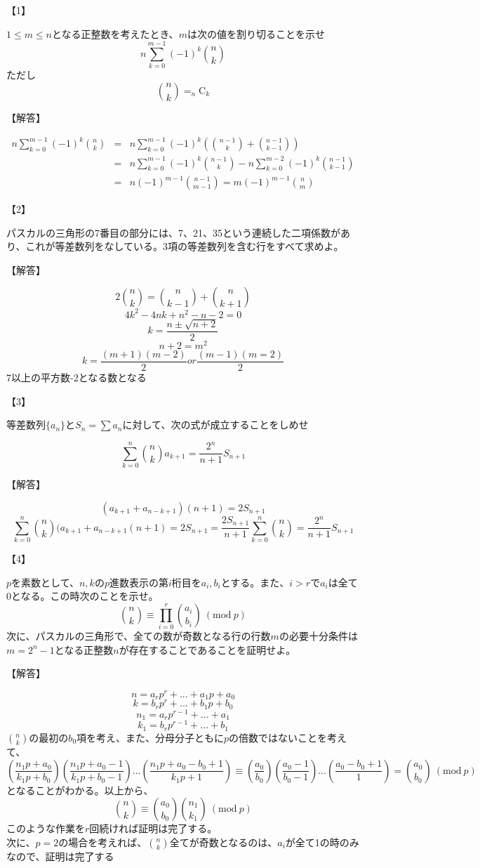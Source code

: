 \documentclass[a4paper,fleqn,dvipdfmx]{jsarticle}
\begin{document}
\begin{flushleft}
【1】
\end{flushleft}
$1\leq m\leq n$となる正整数を考えたとき、$m$は次の値を割り切ることを示せ
$$n\sum_{k=0}^{m-1}(-1)^k\binom{n}{k}
$$
ただし
$$\binom{n}{k}=_n\mathrm{C}_k$$
\begin{flushleft}
【解答】
\end{flushleft}
\begin{eqnarray}
n\sum_{k=0}^{m-1}(-1)^k\binom{n}{k}&=&n\sum_{k=0}^{m-1}(-1)^k\left(\binom{n-1}{k}+\binom{n-1}{k-1}\right)\\
&=&n\sum_{k=0}^{m-1}(-1)^k\binom{n-1}{k}-n\sum_{k=0}^{m-2}(-1)^k\binom{n-1}{k-1}\\
&=&n(-1)^{m-1}\binom{n-1}{m-1}=m(-1)^{m-1}\binom{n}{m}
\end{eqnarray}

\begin{flushleft}
【2】
\end{flushleft}
パスカルの三角形の7番目の部分には、7、21、35という連続した二項係数があり、これが等差数列をなしている。3項の等差数列を含む行をすべて求めよ。
\begin{flushleft}
【解答】
\end{flushleft}
$$2\binom{n}{k}=\binom{n}{k-1}+\binom{n}{k+1}$$
$$4k^2-4nk+n^2-n-2=0$$
$$k=\frac{n\pm \sqrt{n+2}}{2}$$
$$n+2=m^2$$
$$k=\frac{(m+1)(m-2)}{2} or \frac{(m-1)(m=2)}{2}$$
7以上の平方数-2となる数となる

\begin{flushleft}
【3】
\end{flushleft}
等差数列$\{a_n\}$と$S_n=\sum a_n$に対して、次の式が成立することをしめせ

$$\sum_{k=0}^{n}\binom{n}{k}a_{k+1}=\frac{2^n}{n+1}S_{n+1}$$
\begin{flushleft}
【解答】
\end{flushleft}
$$(a_{k+1}+a_{n-k+1})(n+1)=2S_{n+1}$$
$$\sum_{k=0}^n\binom{n}{k}(a_{k+1}+a_{n-k+1}(n+1)=2S_{n+1}=\frac{2S_{n+1}}{n+1}\sum_{k=0}^{n}\binom{n}{k}=\frac{2^n}{n+1}S_{n+1}$$

\begin{flushleft}
【4】
\end{flushleft}
$p$を素数として、$n,k$の$p$進数表示の第$i$桁目を$a_i,b_i$とする。また、$i>r$で$a_i$は全て$0$となる。この時次のことを示せ。
$$\binom{n}{k}\equiv\prod_{i=0}^{r}\binom{a_i}{b_i}\ (\mathrm{mod}\ p)$$
次に、パスカルの三角形で、全ての数が奇数となる行の行数$m$の必要十分条件は$m=2^n-1$となる正整数$n$が存在することであることを証明せよ。
\begin{flushleft}
【解答】
\end{flushleft}
$$n=a_rp^r+...+a_1p+a_0$$
$$k=b_rp^r+...+b_1p+b_0$$
$$n_1=a_rp^{r-1}+...+a_1$$
$$k_1=b_rp^{r-1}+...+b_1$$
$\binom{n}{k}$の最初の$b_0$項を考え、また、分母分子ともに$p$の倍数ではないことを考えて、
$$(\frac{n_1p+a_0}{k_1p+b_0})(\frac{n_1p+a_0-1}{k_1p+b_0-1})...(\frac{n_1p+a_0-b_0+1}{k_1p+1})\equiv(\frac{a_0}{b_0})(\frac{a_0-1}{b_0-1})...(\frac{a_0-b_0+1}{1})=\binom{a_0}{b_0}\ (\mathrm{mod\ }p)$$
となることがわかる。以上から、
$$\binom{n}{k}\equiv\binom{a_0}{b_0}\binom{n_1}{k_1}\ (\mathrm{mod}\ p)$$
このような作業を$r$回続ければ証明は完了する。\\
次に、$p=2$の場合を考えれば、$\binom{n}{k}$全てが奇数となるのは、$a_i$が全て1の時のみなので、証明は完了する
\end{document}
